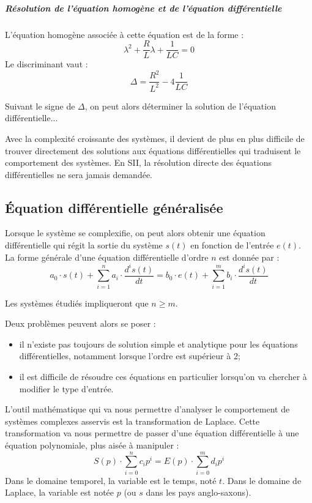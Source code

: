 \documentclass[10pt,fleqn]{article} %
\begin{document}
\subparagraph*{Résolution de l'équation homogène et de l'équation différentielle}
L'équation homogène associée à cette équation est de la forme : 
$$
\lambda^2 +\dfrac{R}{L} \lambda + \dfrac{1}{LC}=0 
$$
Le discriminant vaut : 
$$
\Delta = \dfrac{R^2}{L^2}-4\dfrac{1}{LC}
$$

Suivant le signe de $\Delta$, on peut alors déterminer la solution de l'équation différentielle...


\begin{obj}
Avec la complexité croissante des systèmes, il devient de plus en plus difficile de trouver directement des solutions aux équations différentielles qui traduisent le comportement des systèmes. En SII, la résolution directe des équations différentielles ne sera jamais demandée.
\end{obj}

\subsection{Équation différentielle généralisée}
Lorsque le système se complexifie, on peut alors obtenir une équation différentielle qui régit la sortie du système $s(t)$ en fonction de l'entrée $e(t)$. La forme générale d'une équation différentielle d'ordre $n$ est donnée par :
$$
a_0 \cdot s(t)  + \sum\limits_{i=1}^n a_i \cdot \dfrac{d^i s(t)}{dt}
= b_0 \cdot e(t)  + \sum\limits_{i=1}^m  b_i \cdot\dfrac{d^i s(t)}{dt}
$$

\begin{rem}
Les systèmes étudiés impliqueront que $n\geq m$.
\end{rem}

Deux problèmes peuvent alors se poser :
\begin{itemize}
\item il n'existe pas toujours de solution simple et analytique pour les équations différentielles, notamment lorsque l'ordre est supérieur à 2;
\item il est difficile de résoudre ces équations en particulier lorsqu'on va chercher à modifier le type d'entrée.
\end{itemize}

L'outil mathématique qui va nous permettre d'analyser le comportement de systèmes complexes asservis est la transformation de Laplace. Cette transformation va nous permettre de passer d'une équation différentielle à une équation polynomiale, plus aisée à manipuler :
$$
  S(p) \cdot  \sum\limits_{i=0}^n c_i p^i
= E(p) \cdot  \sum\limits_{i=0}^m d_i p^i
$$
Dans le domaine temporel, la variable est le temps, noté $t$. Dans le domaine de Laplace, la variable est notée $p$ (ou $s$ dans les pays anglo-saxons).
\end{document}
